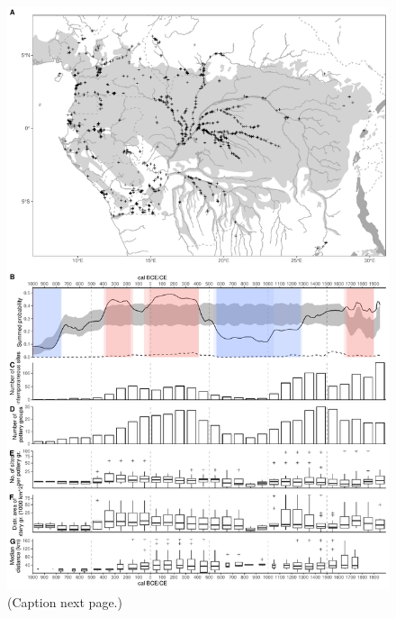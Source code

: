 \documentclass[smallextended,natbib]{svjour3}       %
\begin{document}
\begin{figure}[p]
	\centering 
	\includegraphics[width=\textwidth]{Fig_SPD.pdf}
	\caption{(Caption next page.)}
	\label{fig:spd}
\end{figure}
\addtocounter{figure}{-1}
\end{document}
